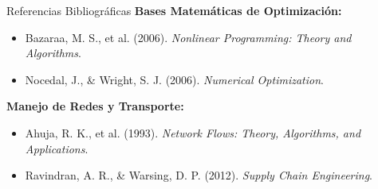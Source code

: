 \documentclass[10pt]{beamer}
\begin{document}
\begin{frame}{Referencias Bibliográficas}
    \footnotesize
    \textbf{Bases Matemáticas de Optimización:}
    \begin{itemize}
        \item Bazaraa, M. S., et al. (2006). \textit{Nonlinear Programming: Theory and Algorithms}.
        \item Nocedal, J., \& Wright, S. J. (2006). \textit{Numerical Optimization}.
    \end{itemize}
    \textbf{Manejo de Redes y Transporte:}
    \begin{itemize}
        \item Ahuja, R. K., et al. (1993). \textit{Network Flows: Theory, Algorithms, and Applications}.
        \item Ravindran, A. R., \& Warsing, D. P. (2012). \textit{Supply Chain Engineering}.
    \end{itemize}
\end{frame}
\end{document}
